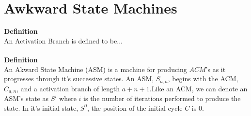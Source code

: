 \documentclass[a4paper,12pt]{article}
\begin{document}
  
\section{Awkward State Machines}

\textbf{Definition}\\
An Activation Branch is defined to be...\\
\\
\textbf{Definition}\\
An Akward State Machine (ASM) is a machine for producing $ACM$'s as it progresses through it's successive states. An ASM, $S_{a,n}$, begins with the ACM, $C_{a,n}$, and a activation branch of length $a + n + 1$.Like an ACM, we can denote an ASM's state as $S^i$ where $i$ is the number of iterations performed to produce the state. In it's initial state, $S^0$, the position of the initial cycle $C$ is 0.
\end{document}
